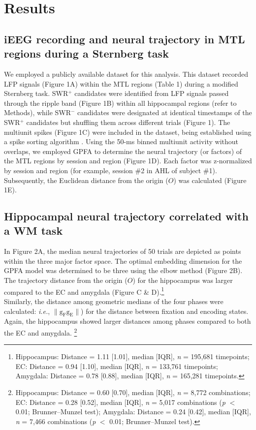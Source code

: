 \section{Results}
\subsection{iEEG recording and neural trajectory in MTL regions during a Sternberg task}
We employed a publicly available dataset \cite{boran_dataset_2020} for this analysis. This dataset recorded LFP signals (Figure 1A) within the MTL regions (Table 1) during a modified Sternberg task. SWR$^+$ candidates were identified from LFP signals passed through the ripple band (Figure 1B) within all hippocampal regions (refer to Methods), while SWR$^-$ candidates were designated at identical timestamps of the SWR$^+$ candidates but shuffling them across different trials (Figure 1). The multiunit spikes (Figure 1C) were included in the dataset, being established using a spike sorting algorithm \cite{niediek_reliable_2016}. Using the 50-ms binned multiunit activity without overlaps, we employed GPFA \cite{yu_gaussian-process_2009} to determine the neural trajectory (or factors) of the MTL regions by session and region (Figure 1D). Each factor was z-normalized by session and region (for example, session \#2 in AHL of subject \#1). Subsequently, the Euclidean distance from the origin ($O$) was calculated (Figure 1E).

\subsection{Hippocampal neural trajectory correlated with a WM task}
In Figure 2A, the median neural trajectories of 50 trials are depicted as points within the three major factor space. The optimal embedding dimension for the GPFA model was determined to be three using the elbow method (Figure 2B). The trajectory distance from the origin ($O$) for the hippocampus was larger compared to the EC and amygdala (Figure C \& D).\footnote{Hippocampus: Distance = 1.11 [1.01], median [IQR], \textit{n} = 195,681 timepoints; EC: Distance = 0.94 [1.10], median [IQR], \textit{n} = 133,761 timepoints; Amygdala: Distance = 0.78 [0.88], median [IQR], \textit{n} = 165,281 timepoints.}
\\
\indent
Similarly, the distance among geometric medians of the four phases were calculated: \textit{i.e.}, $\mathrm{\lVert g_{F}g_{E} \rVert}$) for the distance between fixation and encoding states. Again, the hippocampus showed larger distances among phases compared to both the EC and amygdala. \footnote{Hippocampus: Distance = 0.60 [0.70], median [IQR], \textit{n} = 8,772 combinations; EC: Distance = 0.28 [0.52], median [IQR], \textit{n} = 5,017 combinations (\textit{p} $<$ 0.01; Brunner--Munzel test); Amygdala: Distance = 0.24 [0.42], median [IQR], \textit{n} = 7,466 combinations (\textit{p} $<$ 0.01; Brunner--Munzel test).}

